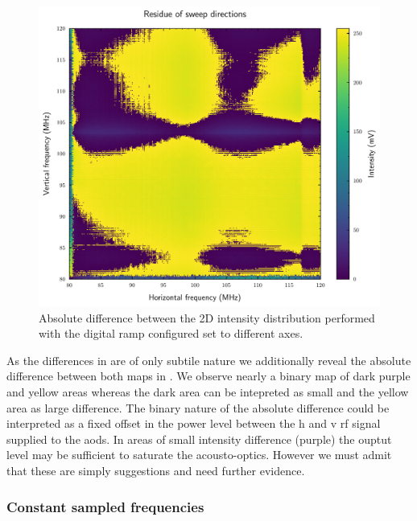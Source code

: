 \begin{figure}[htb]
  \centering
  \includegraphics[width=.7\textwidth]
  {../figure/intensity/distribution/paired-frequency-residue.pdf}
  \caption{Absolute difference between the 2D intensity distribution
    performed with the digital ramp configured set to different axes.
  }\label{fig:intensity_distribution_frequency_residue}
\end{figure}
As the differences in  are of only
subtile nature we additionally reveal the absolute difference between both
maps in . We observe
nearly a binary map of dark purple and yellow areas whereas the dark area can
be intepreted as small and the yellow area as large difference. The binary
nature of the absolute difference could be interpreted as a fixed offset
in the power level between the \gls{h} and \gls{v} \gls{rf} signal supplied to
the \gls{aod}s. In areas of small intensity difference (purple) the ouptut
level may be sufficient to saturate the acousto-optics. However we must admit
that these are simply suggestions and need further evidence.

\subsubsection{Constant sampled frequencies}

